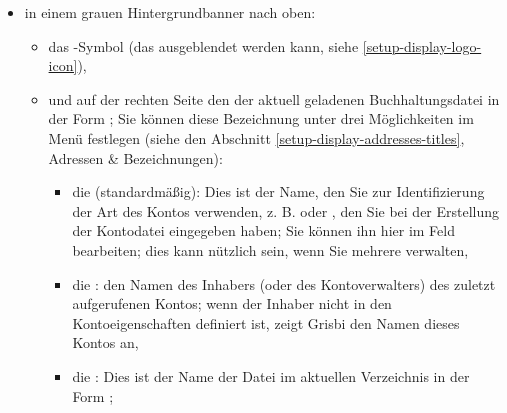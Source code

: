 \begin{itemize}
	\item in einem grauen Hintergrundbanner nach oben:%
		\begin{itemize}
			\item das -Symbol (das ausgeblendet werden kann, siehe \vref{setup-display-logo-icon}),
			\item und auf der rechten Seite den  der aktuell geladenen Buchhaltungsdatei in der Form ; Sie können diese Bezeichnung unter drei Möglichkeiten im Menü  festlegen (siehe den Abschnitt \vref{setup-display-addresses-titles}, Adressen \& Bezeichnungen):%
				\begin{itemize}
			 		\item die  (standardmäßig): Dies ist der Name, den Sie zur Identifizierung der Art des Kontos verwenden, z. B.  oder , den Sie bei der Erstellung der Kontodatei eingegeben haben; Sie können ihn hier im Feld  bearbeiten; dies kann nützlich sein, wenn Sie mehrere  verwalten,%
					\item die : den Namen des Inhabers (oder des Kontoverwalters) des zuletzt aufgerufenen Kontos; wenn der Inhaber nicht in den Kontoeigenschaften definiert ist, zeigt Grisbi den Namen dieses Kontos an,%
			 		\item die : Dies ist der Name der Datei im aktuellen Verzeichnis in der Form ;%

\end{itemize}
\end{itemize}
\end{itemize}
